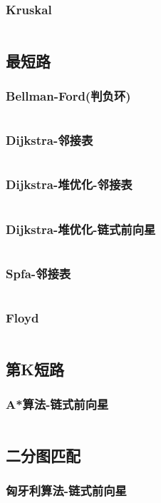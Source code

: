 \documentclass[a4paper,11pt]{article}
\begin{document}
\subsubsection{Kruskal}
\inputminted[breaklines]{c++}{图论/Kruskal.cpp}
\subsection{最短路}
\subsubsection{Bellman-Ford(判负环)}
\inputminted[breaklines]{c++}{图论/Bellman-Ford.cpp}
\subsubsection{Dijkstra-邻接表}
\inputminted[breaklines]{c++}{图论/Dijkstra-邻接表.cpp}
\subsubsection{Dijkstra-堆优化-邻接表}
\inputminted[breaklines]{c++}{图论/Dijkstra-邻接表-堆优化.cpp}
\subsubsection{Dijkstra-堆优化-链式前向星}
\inputminted[breaklines]{c++}{图论/Dijkstra-链式前向星-堆优化.cpp}
\subsubsection{Spfa-邻接表}
\inputminted[breaklines]{c++}{图论/SPFA-邻接表.cpp}
\subsubsection{Floyd}
\inputminted[breaklines]{c++}{图论/Floyd.cpp}
\subsection{第K短路}
\subsubsection{A*算法-链式前向星}
\inputminted[breaklines]{c++}{图论/AStar.cpp}
\subsection{二分图匹配}
\subsubsection{匈牙利算法-链式前向星}
\inputminted[breaklines]{c++}{图论/匈牙利算法-链式前向星.cpp}
\end{document}
